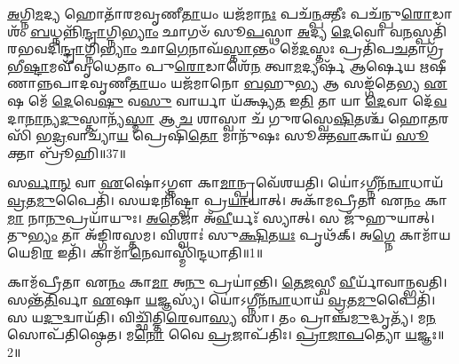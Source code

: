 \-\ul{𑌅}\-𑌗𑍍𑌨𑌿\-\ul{𑌮}\-𑌦𑍍𑌯 𑌹𑍋𑌤𑌾᳴𑌰𑌮𑌵𑍃𑌣𑍀\-\ul{𑌤𑌾}\-𑌯𑌂 𑌯𑌜᳴𑌮𑌾\-\ul{𑌨𑌃} 𑌪𑌚᳴\-\ul{𑌨𑍍𑌪}\-𑌕𑍍𑌤𑍀𑌃 𑌪𑌚᳴𑌨𑍍𑌪𑍁\-\ul{𑌰𑍋}\-𑌡𑌾𑌶𑌂᳴ \ul{𑌬}\-𑌧𑍍𑌨𑌨𑍍𑌨𑌿᳴\-\ul{𑌨𑍍𑌦𑍍𑌰𑌾}\-𑌗𑍍𑌨𑌿\-\ul{𑌭𑍍𑌯𑌾𑌂} 𑌛𑌾𑌗𑍞᳴ 𑌸𑍂\-\ul{𑌪}\-𑌸𑍍𑌥𑌾 \ul{𑌅}\-𑌦𑍍𑌯 \ul{𑌦𑍇}\-𑌵𑍋 𑌵\-\ul{𑌨}\-𑌸𑍍𑌪𑌤𑌿᳴𑌰𑌭𑌵𑌦𑌿\-\ul{𑌨𑍍𑌦𑍍𑌰𑌾}\-𑌗𑍍𑌨𑌿\-\ul{𑌭𑍍𑌯𑌾𑌂} 𑌛𑌾\-\ul{𑌗𑍇}\-𑌨𑌾𑌘᳴\-\ul{𑌸𑍍𑌤𑌾}\-𑌨𑍍𑌤𑌂 𑌮𑍇᳴\-\ul{𑌦}\-𑌸𑍍𑌤𑌃 𑌪𑍍𑌰𑌤𑌿᳴\-𑌪\-\ul{𑌚}\-𑌤𑌾𑌗𑍍𑌰᳴𑌭𑍀\-\ul{𑌷𑍍𑌟𑌾}\-𑌮𑌵𑍀᳴𑌵𑍃𑌧𑍇𑌤𑌾𑌂 𑌪𑍁\-\ul{𑌰𑍋}\-𑌡𑌾𑌶𑍇᳴\-\ul{𑌨} 𑌤𑍍𑌵𑌾\-\ul{𑌮}\-𑌦𑍍𑌯𑌰𑍍\mbox{}𑌷᳴ 𑌆𑌰𑍍\mbox{}𑌷𑍇𑌯 𑌋𑌷𑍀𑌣𑌾𑌨𑍍𑌨𑌪𑌾𑌦𑌵𑍃𑌣𑍀\-\ul{𑌤𑌾}\-𑌯𑌂 𑌯𑌜᳴𑌮𑌾𑌨𑍋 \ul{𑌬}\-𑌹𑍁\-\ul{𑌭𑍍𑌯} 𑌆 𑌸𑌙𑍍𑌗᳴𑌤𑍇𑌭𑍍𑌯 \ul{𑌏}\-𑌷 𑌮𑍇᳴ \ul{𑌦𑍇}\-𑌵𑍇\-\ul{𑌷𑍁} 𑌵\-\ul{𑌸𑍁} 𑌵𑌾𑌰𑍍𑌯𑌾 𑌯᳴𑌕𑍍𑌷𑍍𑌯\-\ul{𑌤} 𑌇\-\ul{𑌤𑌿} 𑌤𑌾 𑌯𑌾 \ul{𑌦𑍇}\-𑌵𑌾 𑌦𑍇᳴\-\ul{𑌵}\-𑌦𑌾\-\ul{𑌨𑌾}\-𑌨𑍍𑌯\-\ul{𑌦𑍁}\-𑌸𑍍𑌤𑌾𑌨𑍍𑌯᳴\-\ul{𑌸𑍍𑌮𑌾} 𑌆 \ul{𑌚} 𑌶𑌾𑌸𑍍𑌵𑌾 𑌚᳴ 𑌗𑍁𑌰𑌸𑍍𑌵𑍇\-\ul{𑌷𑌿}\-𑌤𑌶𑍍𑌚᳴ 𑌹𑍋\-\ul{𑌤}\-𑌰𑌸𑌿᳴ 𑌭\-\ul{𑌦𑍍𑌰}\-𑌵𑌾𑌚𑍍𑌯𑌾᳴\-\ul{𑌯} 𑌪𑍍𑌰𑍇𑌷𑌿᳴\-\ul{𑌤𑍋} 𑌮𑌾𑌨𑍁᳴𑌷𑌃 𑌸𑍂𑌕𑍍𑌤\-\ul{𑌵𑌾}\-𑌕𑌾𑌯᳴ \ul{𑌸𑍂}\-𑌕𑍍𑌤𑌾 𑌬𑍍𑌰𑍂᳴𑌹𑌿॥37॥\anuvakamend[\-\ul{𑌅}\-𑌗𑍍𑌨𑌿\-\ul{𑌮}\-𑌦𑍍𑌯𑍈𑌕𑌮𑍍॑]






\clearpage
{}
\setcounter{anuvakam}{0}

𑌸\-\ul{𑌰𑍍𑌵𑌾}\-\-\ul{𑌨𑍍} 𑌵𑌾 \ul{𑌏}\-𑌷𑍋॑\-𑌽𑌗𑍍𑌨𑍗 𑌕𑌾\-\ul{𑌮𑌾}\-𑌨𑍍𑌪𑍍𑌰𑌵𑍇᳴𑌶𑌯𑌤𑌿।
𑌯𑍋॑𑌽𑌗𑍍𑌨𑍀𑌨᳴\-\ul{𑌨𑍍𑌵𑌾}\-𑌧𑌾𑌯᳴ \ul{𑌵𑍍𑌰}\-𑌤\-\ul{𑌮𑍁}\-𑌪𑍈𑌤𑌿᳴।
𑌸𑌯𑌦𑌨𑌿᳴𑌷𑍍𑌟𑍍𑌵𑌾 𑌪𑍍𑌰\-\ul{𑌯𑌾}\-𑌯𑌾𑌤𑍍।
𑌅𑌕𑌾᳴𑌮𑌪𑍍𑌰𑍀𑌤𑌾 𑌏\-\ul{𑌨𑌂} 𑌕𑌾\-\ul{𑌮𑌾} 𑌨𑌾\-\ul{𑌨𑍁}\-𑌪𑍍𑌰𑌯𑌾᳴𑌯𑍁𑌃।
\-\ul{𑌅}\-\-\ul{𑌤𑍇}\-𑌜𑌾 𑌅᳴\-\ul{𑌵𑍀}\-𑌰𑍍𑌯𑌃᳴ 𑌸𑍍𑌯𑌾𑌤𑍍।
𑌸 𑌜𑍁᳴𑌹𑍁𑌯𑌾𑌤𑍍।
𑌤𑍁\-\ul{𑌭𑍍𑌯𑌂} 𑌤𑌾 𑌅᳴𑌙𑍍𑌗𑌿𑌰𑌸𑍍𑌤𑌮।
𑌵𑌿𑌶𑍍𑌵𑌾𑌃॑ 𑌸𑍁\-\ul{𑌕𑍍𑌷𑌿}\-𑌤\-\ul{𑌯𑌃} 𑌪𑍃𑌥᳴𑌕𑍍।
𑌅\-\ul{𑌗𑍍𑌨𑍇} 𑌕𑌾𑌮𑌾᳴𑌯 𑌯𑍇𑌮𑌿\-\ul{𑌰} 𑌇𑌤𑌿᳴।
𑌕𑌾𑌮𑌾᳴\-\ul{𑌨𑍇}\-𑌵𑌾𑌸𑍍𑌮𑌿᳴𑌨𑍍𑌦𑌧𑌾𑌤𑌿॥1॥

𑌕𑌾𑌮᳴𑌪𑍍𑌰𑍀𑌤𑌾 𑌏\-\ul{𑌨𑌂} 𑌕𑌾\-\ul{𑌮𑌾} 𑌅\-\ul{𑌨𑍁} 𑌪𑍍𑌰𑌯𑌾॑𑌨𑍍𑌤𑌿।
\-\ul{𑌤𑍇}\-\-\ul{𑌜}\-𑌸𑍍𑌵𑍀 \ul{𑌵𑍀}\-𑌰𑍍𑌯𑌾᳴𑌵𑌾𑌨𑍍𑌭𑌵𑌤𑌿।
𑌸𑌨𑍍𑌤᳴\-\ul{𑌤𑌿}\-𑌰𑍍𑌵𑌾 \ul{𑌏}\-𑌷𑌾 \ul{𑌯}\-𑌜𑍍𑌞𑌸𑍍𑌯᳴।
𑌯𑍋॑𑌽𑌗𑍍𑌨𑍀𑌨᳴\-\ul{𑌨𑍍𑌵𑌾}\-𑌧𑌾𑌯᳴ \ul{𑌵𑍍𑌰}\-𑌤\-\ul{𑌮𑍁}\-𑌪𑍈𑌤𑌿᳴।
𑌸 𑌯\-\ul{𑌦𑍁}\-𑌦𑍍𑌵𑌾𑌯᳴𑌤𑌿।
𑌵𑌿𑌚𑍍𑌛𑌿᳴𑌤𑍍𑌤𑌿\-\ul{𑌰𑍇}\-𑌵𑌾\-\ul{𑌸𑍍𑌯} 𑌸𑌾।
𑌤𑌂 𑌪𑍍𑌰𑌾𑌞𑍍𑌚᳴\-\ul{𑌮𑍁}\-𑌦𑍍𑌧𑍃𑌤𑍍𑌯᳴।
𑌮\-\ul{𑌨}\-𑌸𑍋𑌪᳴𑌤𑌿𑌷𑍍𑌠𑍇𑌤।
𑌮\-\ul{𑌨𑍋} 𑌵𑍈 \ul{𑌪𑍍𑌰}\-𑌜𑌾\-𑌪᳴𑌤𑌿𑌃।
\-\ul{𑌪𑍍𑌰𑌾}\-\-\ul{𑌜𑌾}\-\-\ul{𑌪}\-𑌤𑍍𑌯𑍋 \ul{𑌯}\-𑌜𑍍𑌞𑌃॥2॥

